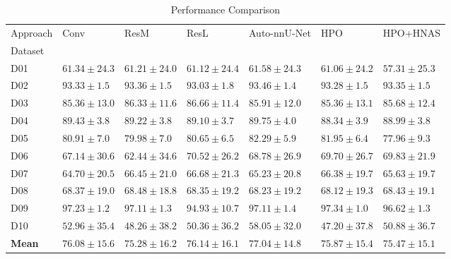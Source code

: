 \begin{table}
\caption{Performance Comparison}
\label{tab:results}
\begin{tabular}{lllllll}
\toprule
Approach & Conv & ResM & ResL & Auto-nnU-Net & HPO & HPO+HNAS \\
Dataset &  &  &  &  &  &  \\
\midrule
D01 & $61.34 \pm 24.3$ & $61.21 \pm 24.0$ & $61.12 \pm 24.4$ & $\mathbf{61.58 \pm 24.3}$ & $61.06 \pm 24.2$ & $57.31 \pm 25.3$ \\
D02 & $93.33 \pm 1.5$ & $93.36 \pm 1.5$ & $93.03 \pm 1.8$ & $\mathbf{93.46 \pm 1.4}$ & $93.28 \pm 1.5$ & $93.35 \pm 1.5$ \\
D03 & $85.36 \pm 13.0$ & $86.33 \pm 11.6$ & $\mathbf{86.66 \pm 11.4}$ & $85.91 \pm 12.0$ & $85.36 \pm 13.1$ & $85.68 \pm 12.4$ \\
D04 & $89.43 \pm 3.8$ & $89.22 \pm 3.8$ & $89.10 \pm 3.7$ & $\mathbf{89.75 \pm 4.0}$ & $88.34 \pm 3.9$ & $88.99 \pm 3.8$ \\
D05 & $80.91 \pm 7.0$ & $79.98 \pm 7.0$ & $80.65 \pm 6.5$ & $\mathbf{82.29 \pm 5.9}$ & $81.95 \pm 6.4$ & $77.96 \pm 9.3$ \\
D06 & $67.14 \pm 30.6$ & $62.44 \pm 34.6$ & $\mathbf{70.52 \pm 26.2}$ & $68.78 \pm 26.9$ & $69.70 \pm 26.7$ & $69.83 \pm 21.9$ \\
D07 & $64.70 \pm 20.5$ & $66.45 \pm 21.0$ & $\mathbf{66.68 \pm 21.3}$ & $65.23 \pm 20.8$ & $66.38 \pm 19.7$ & $65.63 \pm 19.7$ \\
D08 & $68.37 \pm 19.0$ & $\mathbf{68.48 \pm 18.8}$ & $68.35 \pm 19.2$ & $68.23 \pm 19.2$ & $68.12 \pm 19.3$ & $68.43 \pm 19.1$ \\
D09 & $97.23 \pm 1.2$ & $97.11 \pm 1.3$ & $94.93 \pm 10.7$ & $97.11 \pm 1.4$ & $\mathbf{97.34 \pm 1.0}$ & $96.62 \pm 1.3$ \\
D10 & $52.96 \pm 35.4$ & $48.26 \pm 38.2$ & $50.36 \pm 36.2$ & $\mathbf{58.05 \pm 32.0}$ & $47.20 \pm 37.8$ & $50.88 \pm 36.7$ \\
\textbf{Mean} & $76.08 \pm 15.6$ & $75.28 \pm 16.2$ & $76.14 \pm 16.1$ & $\mathbf{77.04 \pm 14.8}$ & $75.87 \pm 15.4$ & $75.47 \pm 15.1$ \\
\bottomrule
\end{tabular}
\end{table}
